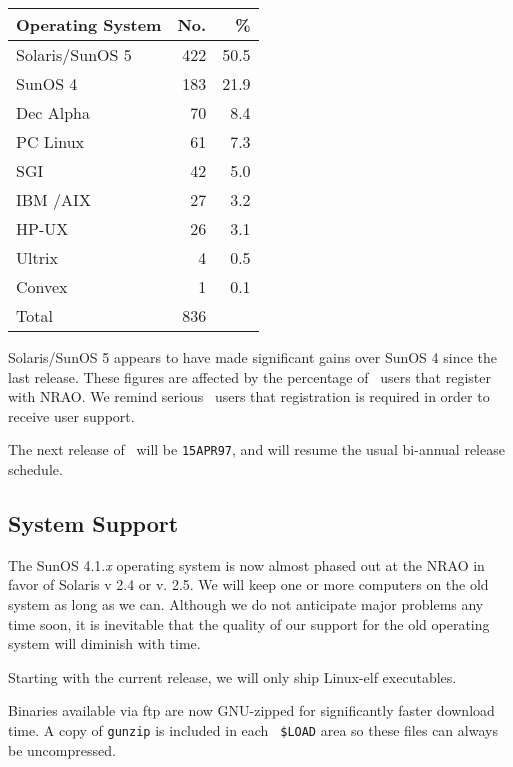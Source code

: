 \parbox{6cm}{\begin{center}
\begin{tabular}{|l|r|r|} \hline\hline
{Operating System} & {No.} & {\%} \\ \hline
Solaris/SunOS 5 &    422       & 50.5 \\
SunOS 4         &    183       & 21.9 \\
Dec Alpha       &     70       &  8.4 \\
PC Linux        &     61       &  7.3 \\
SGI             &     42       &  5.0 \\
IBM /AIX        &     27       &  3.2 \\
HP-UX           &     26       &  3.1 \\
Ultrix          &      4       &  0.5 \\
Convex          &      1       &  0.1 \\ \hline
Total           &    836       &      \\ \hline\hline
\end{tabular}
\end{center}} \hfill \parbox{10cm}{\begin{minipage}{10cm}

Solaris/SunOS 5 appears to have made significant gains over SunOS 4
since the last release. These figures are affected by the percentage
of \AIPS\ users that register with NRAO. We remind serious \AIPS\
users that registration is required in order to receive user support.

The next release of \AIPS\ will be {\tt 15APR97}, and will resume the
usual bi-annual release schedule.
\end{minipage}}

\subsection{System Support}

The SunOS 4.1.{\it x} operating system is now almost phased out at the
NRAO in favor of Solaris v 2.4 or v. 2.5. We will keep one or more
computers on the old system as long as we can.  Although we do not
anticipate major problems any time soon, it is inevitable that the
quality of our support for the old operating system will diminish with
time.

Starting with the current release, we will only ship Linux-elf
executables.

Binaries available via ftp are now GNU-zipped for significantly faster
download time.  A copy of {\tt gunzip} is included in each {\tt
\$LOAD} area so these files can always be uncompressed.

